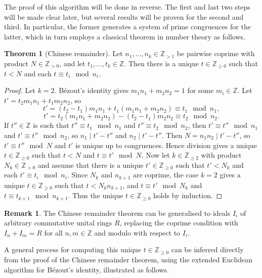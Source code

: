 \documentclass{article}
\newcommand{\Z}{\mathbb{Z}}
\newcommand{\rb}[1]{\left( #1 \right)}
\theoremstyle{definition}\newtheorem*{definition}{Definition}
\theoremstyle{definition}\newtheorem*{example}{Example}
\theoremstyle{definition}\newtheorem*{remark}{Remark}
\newtheorem{theorem}[proposition]{Theorem}
\begin{document}
The proof of this algorithm will be done in reverse. The first and last two steps will be made clear later, but several results will be proven for the second and third. In particular, the former generates a system of prime congruences for the latter, which in turn employs a classical theorem in number theory as follows.

\begin{theorem}[Chinese remainder]
Let $ n_1, \dots, n_k \in \Z_{> 1} $ be pairwise coprime with product $ N \in \Z_{> 0} $, and let $ t_1, \dots, t_k \in \Z $. Then there is a unique $ t \in \Z_{\ge 0} $ such that $ t < N $ and each $ t \equiv t_i \mod n_i $.
\end{theorem}

\begin{proof}
Let $ k = 2 $. Bézout's identity gives $ m_1n_1 + m_2n_2 = 1 $ for some $ m_i \in \Z $. Let $ t' = t_2m_1n_1 + t_1m_2n_2 $, so
$$ t' = \rb{t_2 - t_1}m_1n_1 + t_1\rb{m_1n_1 + m_2n_2} \equiv t_1 \mod n_1, $$
$$ t' = t_2\rb{m_1n_1 + m_2n_2} - \rb{t_2 - t_1}m_2n_2 \equiv t_2 \mod n_2. $$
If $ t'' \in \Z $ is such that $ t'' \equiv t_1 \mod n_1 $ and $ t'' \equiv t_2 \mod n_2 $, then $ t' \equiv t'' \mod n_1 $ and $ t' \equiv t'' \mod n_2 $, so $ n_1 \mid t' - t'' $ and $ n_2 \mid t' - t'' $. Then $ N = n_1n_2 \mid t' - t'' $, so $ t' \equiv t'' \mod N $ and $ t' $ is unique up to congruences. Hence division gives a unique $ t \in \Z_{\ge 0} $ such that $ t < N $ and $ t \equiv t' \mod N $. Now let $ k \in \Z_{\ge 2} $ with product $ N_k \in \Z_{> 0} $ and assume that there is a unique $ t' \in \Z_{\ge 0} $ such that $ t' < N_k $ and each $ t' \equiv t_i \mod n_i $. Since $ N_k $ and $ n_{k + 1} $ are coprime, the case $ k = 2 $ gives a unique $ t \in \Z_{\ge 0} $ such that $ t < N_kn_{k + 1} $, and $ t \equiv t' \mod N_k $ and $ t \equiv t_{k + 1} \mod n_{k + 1} $. Thus the unique $ t \in \Z_{\ge 0} $ holds by induction.
\end{proof}

\begin{remark}
The Chinese remainder theorem can be generalised to ideals $ I_i $ of arbitrary commutative unital rings $ R $, replacing the coprime condition with $ I_n + I_m = R $ for all $ n, m \in \Z $ and modulo with respect to $ I_i $.
\end{remark}

A general process for computing this unique $ t \in \Z_{\ge 0} $ can be inferred directly from the proof of the Chinese remainder theorem, using the extended Euclidean algorithm for Bézout's identity, illustrated as follows.
\end{document}
